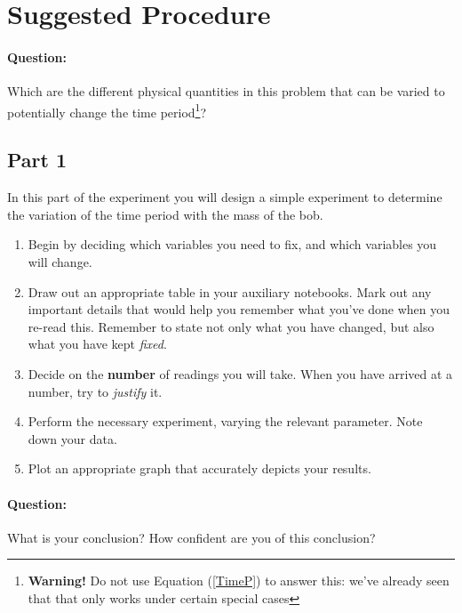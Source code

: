 \section{Suggested Procedure}

\paragraph{Question:} Which are the different physical quantities in this problem that can be varied to potentially change the time period\footnote{\textbf{Warning!} Do not use Equation (\ref{TimeP}) to answer this: we've already seen that that only works under certain special cases}?

\subsection{Part 1}

In this part of the experiment you will design a simple experiment to determine the variation of the time period with the mass of the bob.

\begin{enumerate}
    \item Begin by deciding which variables you need to fix, and which variables you will change.
    
    \item Draw out an appropriate table in your auxiliary notebooks. Mark out any important details that would help you remember what you've done when you re-read this. Remember to state not only what you have changed, but also what you have kept \textit{fixed}.
    
    \item Decide on the \textbf{number} of readings you will take. When you have arrived at a number, try to \textit{justify} it.
    
    \item Perform the necessary experiment, varying the relevant parameter. Note down your data.
    
    \item Plot an appropriate graph that accurately depicts your results.
\end{enumerate}

\paragraph{Question:} What is your conclusion? How confident are you of this conclusion?


